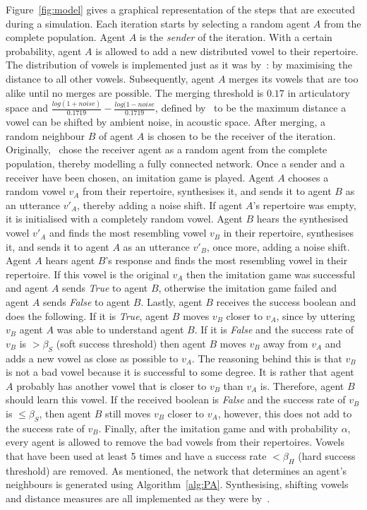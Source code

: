 \documentclass{article}
\begin{document}
Figure~\ref{fig:model} gives a graphical representation of the steps that are executed during a simulation. Each
iteration starts by selecting a random agent $A$ from the complete population. Agent $A$ is the \textit{sender} of the
iteration. With a certain probability, agent $A$ is allowed to add a new distributed vowel to their repertoire.
The distribution of vowels is implemented just as it was by~: by
maximising the distance to all other vowels. Subsequently, agent $A$ merges its vowels that are too alike until no merges
are possible. The merging threshold is $0.17$ in articulatory space and $\frac{log(1+noise)}{0.1719} - \frac{log(1-noise}{0.1719}$,
defined by~ to be the maximum distance
a vowel can be shifted by ambient noise, in acoustic space.
After merging, a random neighbour $B$ of agent $A$ is chosen to be the receiver of the iteration.
Originally,~ chose the receiver agent as a random agent from the
complete population, thereby modelling a fully connected network. Once a sender and a receiver have been chosen, an
imitation game is played. Agent $A$ chooses a random vowel $v_A$ from their repertoire, synthesises it, and sends it to
agent $B$ as an utterance $v'_A$, thereby adding a noise shift. If agent $A$'s repertoire was empty, it is
initialised with a completely random vowel. Agent $B$ hears the synthesised vowel $v'_A$ and finds the most resembling
vowel $v_B$ in their repertoire, synthesises it, and sends it to agent $A$ as an utterance $v'_B$, once more, adding a
noise shift. Agent $A$ hears agent $B$'s response and finds the most resembling vowel in their repertoire. If
this vowel is the original $v_A$ then the imitation game was successful and agent $A$ sends \textit{True} to agent $B$,
otherwise the imitation game failed and agent $A$ sends \textit{False} to agent $B$. Lastly, agent $B$ receives the
success boolean and does the following. If it is \textit{True}, agent $B$ moves $v_B$ closer to $v_A$, since by
uttering $v_B$ agent $A$ was able to understand agent $B$. If it is \textit{False} and the success rate of $v_B$ is $>\beta_S$ (soft success threshold)
then agent $B$ moves $v_B$ away from $v_A$ and adds a new vowel as close as possible to $v_A$. The reasoning
behind this is that $v_B$ is not a bad vowel because it is successful to some degree. It is rather that
agent $A$ probably has another vowel that is closer to $v_B$ than $v_A$ is. Therefore, agent $B$ should learn this
vowel. If the received boolean is \textit{False} and the success rate of $v_B$ is $\leq \beta_S$, then agent $B$ still
moves $v_B$ closer to $v_A$, however, this does not add to the success rate of $v_B$. Finally, after the imitation game
and with probability $\alpha$, every agent is allowed to remove the bad vowels from their repertoires.
Vowels that have been used at least 5 times and have a success rate $< \beta_H$ (hard success threshold) are removed. As mentioned, the network
that determines an agent's neighbours is generated using Algorithm~\ref{alg:PA}. Synthesising, shifting vowels and
distance measures are all implemented as they were by~.
\end{document}
